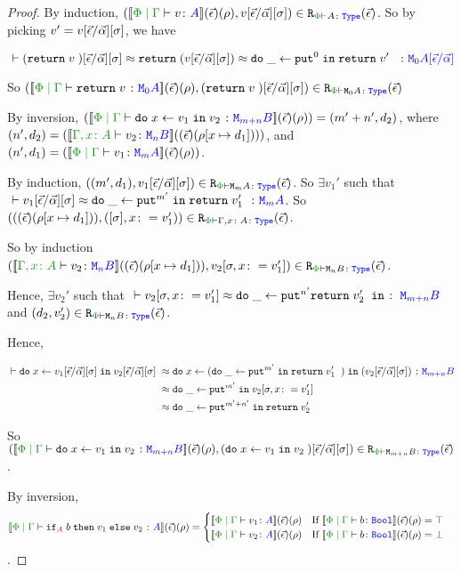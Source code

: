 \begin{proof}
    By induction, $\inLogRelPE{\deno{\gpetyperelation{v}{A}}\fundRho}{v\fundSub}{A}$. So by picking $v' = v[\vec{\epsilon} / \vec{\alpha}][\sigma]$, we have
    
    \begin{equation}
        \zberelation{(\return{v})\fundSub}{\return{(v\fundSub)\beequiv \doin{\_}{\put^0}{\return{v'}}}}{\M{0}{A\ssub{\av}{\ev}}}
    \end{equation}
    
    So $\inLogRelPE{\deno{\gpetyperelation{\return{v}}{\M{0}{A}}}\fundRho}{(\return{v})\fundSub}{\M{0}{A}}$
    
    \case{\vbind}
    
    By inversion, $(\deno{\gpetyperelation{\doin{x}{v_1}{v_2}}{\M{m+n}{B}}}\fundRho) = (m'+n', d_2)$, where $(n', d_2) = (\deno{\typerelation{\gax}{v_2}{\mnb}}(\fundRhoExt{[x\mapsto d_1]}))$, and $(n', d_1) = (\deno{\gpetyperelation{v_1}{\mma}}\fundRho)$.
    
    By induction, $\inLogRelPE{(m', d_1)}{v_1\fundSub}{\mma}$. So $\exists v_1'$ such that $\zberelation{v_1\fundSub}{\doin{\_}{\put^{m'}}{\return{v_1'}}}{\mma}$. So $\inLogRelPE{(\fundRhoExt{[x\mapsto d_1]})}{(\ssi, x\setto v_1')}{\gax}$.
    
    So by induction $\inLogRelPE{\deno{\typerelation{\gax}{v_2}{\mnb}}(\fundRhoExt{[x\mapsto d_1]})}{v_2\sub{\si, x\setto v_1'}}{\mnb}$.
    
    Hence, $\exists v_2'$ such that $\zberelation{v_2\sub{\si, x\setto v_1'}}{\doin{\_}{\put^{n'}{\return{v_2'}}}}{\M{m + n}{B}}$ and $\inLogRelPE{d_2}{v_2'}{\mnb}$.
    
    Hence,
    
    \begin{align*}
        \zberelation{\doin{x}{v_1\fundSub}{v_2\fundSub}&}{\doin{x}{(\doin{\_}{\put^{m'}}{\return{v_1'}})}{(v_2\fundSub)}}{\M{m+n}{B}}\\
        &\beequiv\doin{\_}{\put^{m'}}{v_2\sub{\si, x\setto{v_1'}}}\\
        &\beequiv\doin{\_}{\put^{m'+n'}}{\return{v_2'}}
    \end{align*}
    
    So $\inLogRelPE{\deno{\gpetyperelation{\doin{x}{v_1}{v_2}}{\M{m+n}{B}}}\fundRho}{(\doin{x}{v_1}{v_2})\fundSub}{\M{m+n}{B}}$.
    
    
    
    \case{\vif}
    
    By inversion, $$\deno{\gpetyperelation{\pifthenelse{A}{b}{v_1}{v_2}}{A}}\fundRho = \begin{cases}
        \deno{\gpetyperelation{v_1}{A}}\fundRho \qt{If }\deno{\gpetyperelation{b}{\B}}\fundRho = \top\\
        \deno{\gpetyperelation{v_2}{A}}\fundRho \qt{If }\deno{\gpetyperelation{b}{\B}}\fundRho = \bot
    \end{cases}
    $$.
    

\end{proof}
